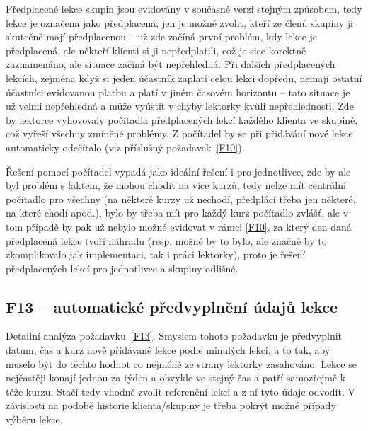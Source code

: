 Předplacené lekce skupin jsou evidovány v současné verzi stejným způsobem, tedy lekce je označena jako předplacená, jen je možné zvolit, kteří ze členů skupiny ji skutečně mají předplacenou -- už zde začíná první problém, kdy lekce je předplacená, ale někteří klienti si ji nepředplatili, což je sice korektně zaznamenáno, ale situace začíná být nepřehledná. Při dalších předplacených lekcích, zejména když si jeden účastník zaplatí celou lekci dopředu, nemají ostatní účastníci evidovanou platbu a platí v jiném časovém horizontu -- tato situace je už velmi nepřehledná a může vyústit v chyby lektorky kvůli nepřehlednosti. Zde by lektorce vyhovovaly počítadla předplacených lekcí každého klienta ve skupině, což vyřeší všechny zmíněné problémy. Z počítadel by se při přidávání nové lekce automaticky odečítalo (viz příslušný požadavek~\ref{F10}).

Řešení pomocí počítadel vypadá jako ideální řešení i pro jednotlivce, zde by ale byl problém s faktem, že mohou chodit na více kurzů, tedy nelze mít centrální počítadlo pro všechny (na některé kurzy už nechodí, předplácí třeba jen některé, na které chodí apod.), bylo by třeba mít pro každý kurz počítadlo zvlášť, ale v tom případě by pak už nebylo možné evidovat v rámci \ref{F10}, za který den daná předplacená lekce tvoří náhradu (resp. možné by to bylo, ale značně by to zkomplikovalo jak implementaci, tak i práci lektorky), proto je řešení předplacených lekcí pro jednotlivce a skupiny odlišné.

\subsection{F13 -- automatické předvyplnění údajů lekce}\label{subsec:F13detail}

Detailní analýza požadavku~\ref{F13}.
Smyslem tohoto požadavku je předvyplnit datum, čas a kurz nově přidávané lekce podle minulých lekcí, a to tak, aby muselo být do těchto hodnot co nejméně ze strany lektorky zasahováno. Lekce se nejčastěji konají jednou za týden a obvykle ve stejný čas a patří samozřejmě k téže kurzu. Stačí tedy vhodně zvolit referenční lekci a z ní tyto údaje odvodit. V závislosti na podobě historie klienta/skupiny je třeba pokrýt možné případy výběru lekce.

